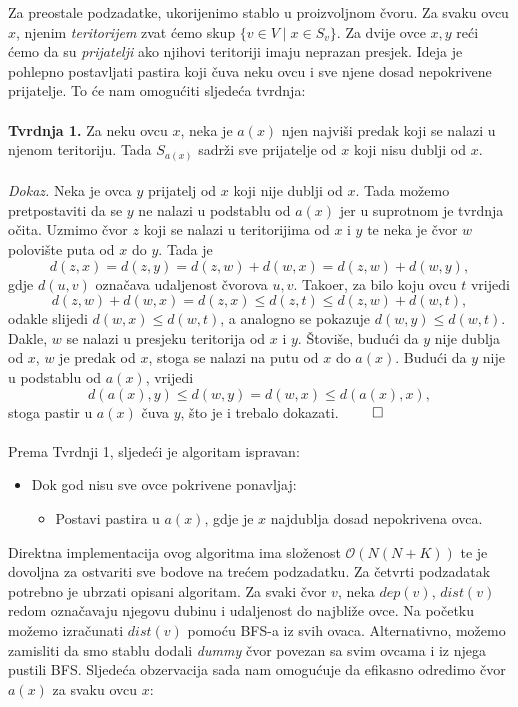 Za preostale podzadatke, ukorijenimo stablo u proizvoljnom čvoru. Za svaku ovcu $x$, njenim \emph{teritorijem} zvat ćemo skup $\{v \in V \mid x \in S_v\}$. Za dvije ovce $x, y$ reći ćemo da su \emph{prijatelji} ako njihovi teritoriji imaju neprazan presjek. Ideja je pohlepno postavljati pastira koji čuva neku ovcu i sve njene dosad nepokrivene prijatelje. To će nam omogućiti sljedeća tvrdnja:
\\\\
\textbf{Tvrdnja 1.} Za neku ovcu $x$, neka je $a(x)$ njen najviši predak koji se nalazi u njenom teritoriju. Tada $S_{a(x)}$ sadrži sve prijatelje od $x$ koji nisu dublji od $x$.
\\\\
\textit{Dokaz.} Neka je ovca $y$ prijatelj od $x$ koji nije dublji od $x$. Tada možemo pretpostaviti da se $y$ ne nalazi u podstablu od $a(x)$ jer u suprotnom je tvrdnja očita. Uzmimo čvor $z$ koji se nalazi u teritorijima od $x$ i $y$ te neka je čvor $w$ polovište puta od $x$ do $y$. Tada je
$$d(z, x) = d(z, y) = d(z, w) + d(w, x) = d(z, w) + d(w, y),$$ gdje $d(u, v)$ označava udaljenost čvorova $u, v$. Tako\dj er, za bilo koju ovcu $t$ vrijedi $$d(z, w) + d(w, x) = d(z, x) \leq d(z, t) \leq d(z, w) + d(w, t),$$ odakle slijedi $d(w, x) \leq d(w, t)$, a analogno se pokazuje $d(w, y) \leq d(w, t)$. Dakle, $w$ se nalazi u presjeku teritorija od $x$ i $y$. Štoviše, budući da $y$ nije dublja od $x$, $w$ je predak od $x$, stoga se nalazi na putu od $x$ do $a(x)$. Budući da $y$ nije u podstablu od $a(x)$, vrijedi $$d(a(x), y) \leq d(w, y) = d(w, x) \leq d(a(x), x),$$ stoga pastir u $a(x)$ čuva $y$, što je i trebalo dokazati. $\qed$
\\\\
Prema Tvrdnji 1, sljedeći je algoritam ispravan:
\begin{itemize}
    \item Dok god nisu sve ovce pokrivene ponavljaj:
    \begin{itemize}
        \item Postavi pastira u $a(x)$, gdje je $x$ najdublja dosad nepokrivena ovca.
    \end{itemize}
\end{itemize}
Direktna implementacija ovog algoritma ima složenost $\mathcal{O}(N(N + K))$ te je dovoljna za ostvariti sve bodove na trećem podzadatku. Za četvrti podzadatak potrebno je ubrzati opisani algoritam. Za svaki čvor $v$, neka $dep(v)$, $dist(v)$ redom označavaju njegovu dubinu i udaljenost do najbliže ovce. Na početku možemo izračunati $dist(v)$ pomoću BFS-a iz svih ovaca. Alternativno, možemo zamisliti da smo stablu dodali \emph{dummy} čvor povezan sa svim ovcama i iz njega pustili BFS. Sljedeća obzervacija sada nam omogućuje da efikasno odredimo čvor $a(x)$ za svaku ovcu $x$:

